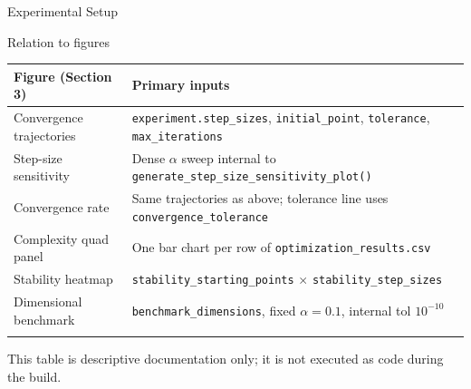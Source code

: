 \documentclass[
  ignorenonframetext,
]{beamer}
\newcounter{none} %
\begin{document}
\begin{frame}[fragile]{Experimental Setup}
\begin{block}{Relation to figures}
\protect{}\label{relation-to-figures}
{\def\LTcaptype{none} %
\begin{longtable}[]{@{}
  >{\raggedright\arraybackslash}p{}
  >{\raggedright\arraybackslash}p{}@{}}
\toprule\noalign{}
\begin{minipage}[b]{\linewidth}\raggedright
Figure (Section 3)
\end{minipage} & \begin{minipage}[b]{\linewidth}\raggedright
Primary inputs
\end{minipage} \\
\midrule\noalign{}
\endhead
Convergence trajectories & \texttt{experiment.step\_sizes},
\texttt{initial\_point}, \texttt{tolerance}, \texttt{max\_iterations} \\
Step-size sensitivity & Dense \(\alpha\) sweep internal to
\texttt{generate\_step\_size\_sensitivity\_plot()} \\
Convergence rate & Same trajectories as above; tolerance line uses
\texttt{convergence\_tolerance} \\
Complexity quad panel & One bar chart per row of
\texttt{optimization\_results.csv} \\
Stability heatmap & \texttt{stability\_starting\_points} \(\times\)
\texttt{stability\_step\_sizes} \\
Dimensional benchmark & \texttt{benchmark\_dimensions}, fixed
\(\alpha=0.1\), internal tol \(10^{-10}\) \\
\bottomrule\noalign{}
\end{longtable}
}

This table is descriptive documentation only; it is not executed as code
during the build.
\end{block}
\end{frame}
\end{document}
